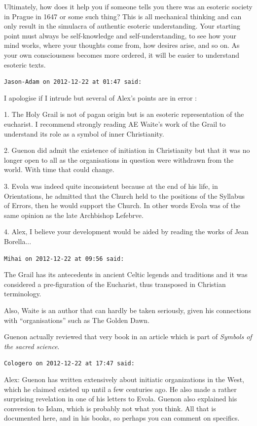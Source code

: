 \begin{footnotesize}
\begin{sffamily}
Ultimately, how does it help you if someone tells you there was an esoteric society in Prague in 1647 or some such thing? This is all mechanical thinking and can only result in the simulacra of authentic esoteric understanding. Your starting point must always be self-knowledge and self-understanding, to see how your mind works, where your thoughts come from, how desires arise, and so on. As your own consciousness becomes more ordered, it will be easier to understand esoteric texts.

\hfill

\texttt{Jason-Adam on 2012-12-22 at 01:47 said:}

I apologise if I intrude but several of Alex's points are in error :

1. The Holy Grail is not of pagan origin but is an esoteric representation of the eucharist. I recommend strongly reading AE Waite's work of the Grail to understand its role as a symbol of inner Christianity.

2. Guenon did admit the existence of initiation in Christianity but that it was no longer open to all as the organisations in question were withdrawn from the world. With time that could change.

3. Evola was indeed quite inconsistent because at the end of his life, in Orientations, he admitted that the Church held to the positions of the Syllabus of Errors, then he would support the Church. In other words Evola was of the same opinion as the late Archbishop Lefebrve.

4. Alex, I believe your development would be aided by reading the works of Jean Borella...

\hfill

\texttt{Mihai on 2012-12-22 at 09:56 said:}

The Grail has its antecedents in ancient Celtic legends and traditions and it was considered a pre-figuration of the Eucharist, thus transposed in Christian terminology.

Also, Waite is an author that can hardly be taken seriously, given his connections with ``organisations'' such as The Golden Dawn.

Guenon actually reviewed that very book in an article which is part of \textit{Symbols of the sacred science}.

\hfill

\texttt{Cologero on 2012-12-22 at 17:47 said:}

Alex: Guenon has written extensively about initiatic organizations in the West, which he claimed existed up until a few centuries ago. He also made a rather surprising revelation in one of his letters to Evola. Guenon also explained his conversion to Islam, which is probably not what you think. All that is documented here, and in his books, so perhaps you can comment on specifics.


\end{sffamily}
\end{footnotesize}
